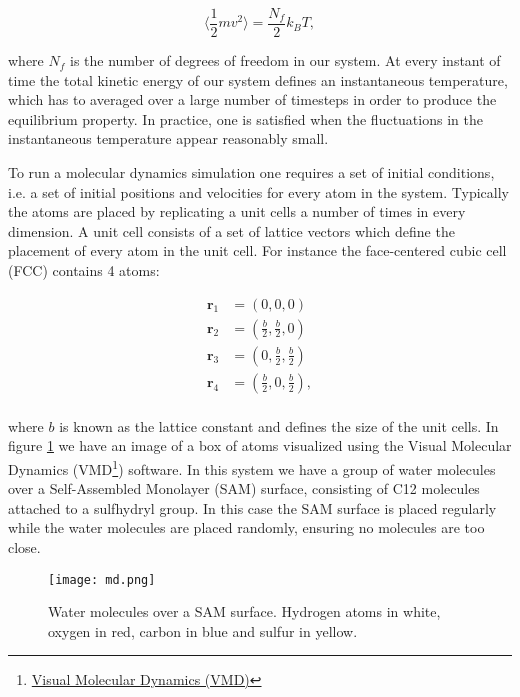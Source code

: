 \begin{equation}
 \langle \frac{1}{2} m v^2 \rangle = \frac{N_f}{2} k_B T , 
\end{equation}

where $N_f$ is the number of degrees of freedom in our system.
At every instant of time the total kinetic energy
of our system defines an instantaneous temperature,
which has to averaged over a large number of timesteps
in order to produce the equilibrium property.
In practice, one is satisfied when the fluctuations
in the instantaneous temperature appear reasonably small.
\par
To run a molecular dynamics simulation one requires
a set of initial conditions, i.e. a set of initial positions and velocities
for every atom in the system. Typically the atoms
are placed by replicating a unit cells a number of times
in every dimension. A unit cell consists of a set
of lattice vectors which define the placement of every atom in the
unit cell. For instance the face-centered cubic cell (FCC)
contains 4 atoms:

\begin{equation}
    \begin{split}
        \bm{r}_1 &= (0, 0, 0) \\
        \bm{r}_2 &= (\frac{b}{2}, \frac{b}{2}, 0) \\
        \bm{r}_3 &= (0, \frac{b}{2}, \frac{b}{2}) \\
        \bm{r}_4 &= (\frac{b}{2}, 0, \frac{b}{2}) , \\
    \end{split}
\end{equation}

where $b$ is known as the lattice constant and defines
the size of the unit cells.
In figure \ref{fig:md} we have an image of a
box of atoms visualized using the Visual Molecular Dynamics (VMD\footnote
{\href{https://www.ks.uiuc.edu/Research/vmd/}{Visual Molecular Dynamics (VMD)}}) software.
In this system we have a group of water molecules over a Self-Assembled
Monolayer (SAM) surface, consisting of C12 molecules attached to a 
sulfhydryl group. In this case the SAM surface is placed regularly
while the water molecules are placed randomly, ensuring no molecules are too close.

\begin{figure}[H]
    \centering
    \texttt{[image: md.png]}
    \caption{Water molecules over a SAM surface. Hydrogen atoms in white,
        oxygen in red, carbon in blue and sulfur in yellow.}
    \label{fig:md}
\end{figure}

